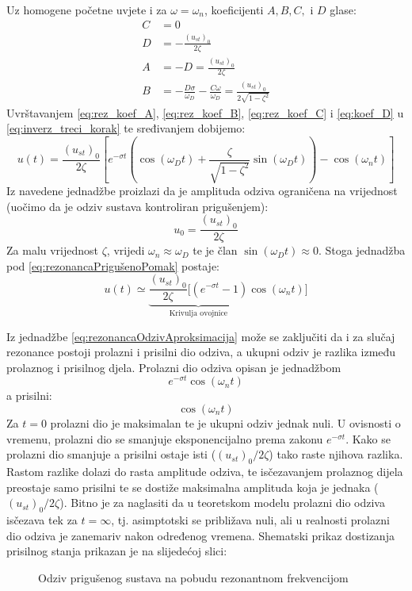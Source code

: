 Uz homogene početne uvjete i za $\omega=\omega_n$, koeficijenti $A,B,C,\text{ i }D$
glase:
\begin{align}
    C &= 0 \label{eq:rez_koef_C}\\
    D &= -\frac{(u_{st})_0}{2\zeta}\label{eq:rez_koef_D}\\
    A &= -D = \frac{(u_{st})_0}{2\zeta}\label{eq:rez_koef_A}\\
    B &= -\frac{D\sigma}{\omega_D}-\frac{C\omega}{\omega_D}=
          \frac{(u_{st})_0}{2\sqrt{1-\zeta^2}}\label{eq:rez_koef_B}
\end{align}
Uvrštavanjem \eqref{eq:rez_koef_A}, \eqref{eq:rez_koef_B}, \eqref{eq:rez_koef_C} i \eqref{eq:koef_D}
u \eqref{eq:inverz_treci_korak} te sređivanjem dobijemo:
\begin{equation}\label{eq:rezonancaPrigušenoPomak}
    u(t)=\frac{(u_{st})_0}{2\zeta}\left[
        e^{-\sigma t} \left(
            \cos(\omega_D t)+\frac{\zeta}{\sqrt{1-\zeta^2}}\sin(\omega_D t)
            \right)
        -\cos(\omega_n t)
        \right]
\end{equation}
Iz navedene jednadžbe proizlazi da je amplituda odziva ograničena na vrijednost
(uočimo da je odziv sustava kontroliran prigušenjem):
\begin{equation}\label{eq:rezonanca_amplituda}
    u_0=\frac{(u_{st})_0}{2\zeta}
\end{equation}
Za malu vrijednost $\zeta$, vrijedi $\omega_n\approx\omega_D$ te je član
$\sin(\omega_Dt) \approx 0$. Stoga jednadžba pod \eqref{eq:rezonancaPrigušenoPomak}
postaje:
\begin{equation}\label{eq:rezonancaOdzivAproksimacija}
    u(t)\simeq\underbrace{
        \frac{(u_{st})_0}{2\zeta}[(e^{-\sigma t}-1)
        }_{\text{Krivulja ovojnice}}
        \cos(\omega_nt)]
\end{equation}

Iz jednadžbe \eqref{eq:rezonancaOdzivAproksimacija} može se zaključiti da i za
slučaj rezonance postoji prolazni i prisilni dio odziva, a ukupni odziv je razlika
između prolaznog i prisilnog djela. Prolazni dio odziva opisan je jednadžbom
\[
    e^{-\sigma t} \cos(\omega_n t)
\]
a prisilni:
\[
    \cos(\omega_n t)
\]
Za $t=0$ prolazni dio je maksimalan te je ukupni odziv jednak nuli. U ovisnosti o
vremenu, prolazni dio se smanjuje eksponencijalno prema zakonu $e^{-\sigma t}$. Kako
se prolazni dio smanjuje a prisilni ostaje isti ($(u_{st})_0/2\zeta$) tako raste
njihova razlika. Rastom razlike dolazi do rasta amplitude odziva, te isčezavanjem
prolaznog dijela preostaje samo prisilni te se dostiže maksimalna amplituda koja je
jednaka ($(u_{st})_0/2\zeta$). Bitno je za naglasiti da u teoretskom modelu
prolazni dio odziva isčezava tek za $t=\infty$, tj. asimptotski se približava nuli,
ali u realnosti prolazni dio odziva je zanemariv nakon određenog vremena. Shematski
prikaz dostizanja prisilnog stanja prikazan je na slijedećoj slici:
\begin{figure}[H]
     
    \caption{Odziv prigušenog sustava na pobudu rezonantnom frekvencijom}
    \label{fig:rezonanca-priguseno}
\end{figure}

